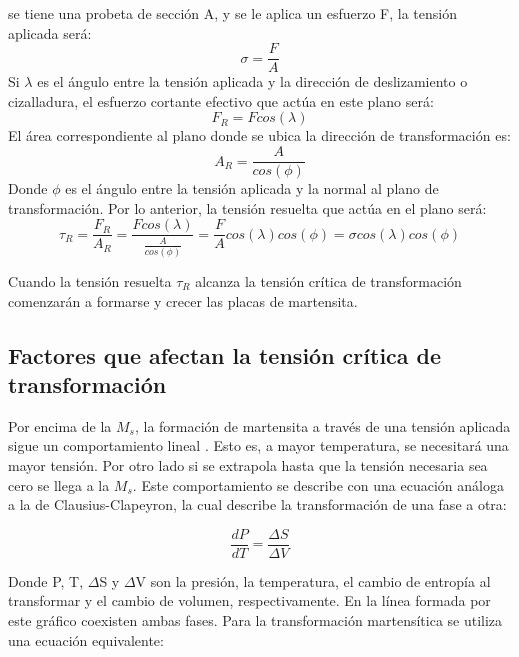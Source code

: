 \documentclass[a4paper,12pt,fleqn,twoside,openany]{book}
\begin{document}
 se tiene una probeta de 
sección A, y se le aplica un esfuerzo F, la tensión aplicada será:
\begin{equation}
 \sigma = \frac{F}{A}
\end{equation}
Si $\lambda$ es el ángulo entre la tensión aplicada y la dirección de deslizamiento o cizalladura, el esfuerzo cortante efectivo que actúa en este plano será:
\begin{equation}
 F_{R}= F cos(\lambda)
\end{equation}
El área correspondiente al plano donde se ubica la dirección de transformación es:
\begin{equation}
 A_{R}=\frac{A}{cos(\phi)}
\end{equation}
Donde $\phi$ es el ángulo entre la tensión aplicada y la normal al plano de transformación. Por lo anterior, la tensión resuelta que actúa en el plano será:
\begin{equation}
 \tau_{R}=\frac{F_{R}}{A_{R}}= \frac{Fcos(\lambda) }{\frac{A}{cos(\phi)}}=\frac{F}{A} cos(\lambda)cos(\phi) = \sigma cos(\lambda)cos(\phi)
\end{equation}

Cuando la tensión resuelta $\tau_R$ alcanza la tensión crítica de transformación comenzarán a formarse y crecer las placas de martensita.


\subsection{Factores que afectan la tensión crítica de transformación}


Por encima de la $M_s$, la formación de martensita a través de una tensión aplicada sigue un comportamiento lineal \cite{pierre}. Esto es, a mayor temperatura, se 
necesitará una mayor tensión. Por otro lado si se extrapola hasta que la tensión necesaria sea cero se llega a la $M_s$. Este comportamiento se describe con una ecuación 
análoga a la de Clausius-Clapeyron, la cual describe la transformación de una fase a otra:

\begin{equation}
 \frac{dP}{dT}=\frac{\Delta S}{\Delta V}
\end{equation}

Donde P, T, $\Delta$S y $\Delta$V son la presión, la temperatura, el cambio de entropía al transformar y el cambio de volumen, respectivamente. En la línea formada por este gráfico 
coexisten ambas fases. Para la transformación martensítica se utiliza una ecuación equivalente:
\end{document}
